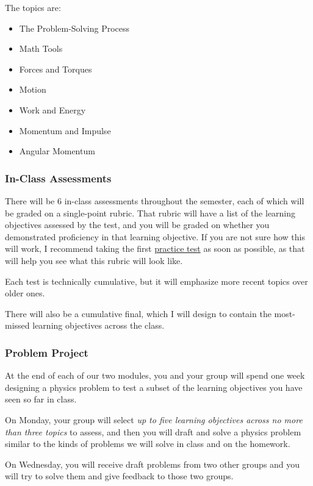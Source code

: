\documentclass[
  letterpaper,
  DIV=11,
  numbers=noendperiod]{scrartcl}
\providecommand{\tightlist}{%
  \setlength{\itemsep}{0pt}\setlength{\parskip}{0pt}}
\begin{document}
The topics are:

\begin{itemize}
\tightlist
\item
  The Problem-Solving Process
\item
  Math Tools
\item
  Forces and Torques
\item
  Motion
\item
  Work and Energy
\item
  Momentum and Impulse
\item
  Angular Momentum
\end{itemize}

\subsubsection{In-Class Assessments}

There will be 6 in-class assessments throughout the semester, each of
which will be graded on a single-point rubric. That rubric will have a
list of the learning objectives assessed by the test, and you will be
graded on whether you demonstrated proficiency in that learning
objective. If you are not sure how this will work, I recommend taking
the first \hyperref[practicetests]{practice test} as soon as possible,
as that will help you see what this rubric will look like.

Each test is technically cumulative, but it will emphasize more recent
topics over older ones.

There will also be a cumulative final, which I will design to contain
the most-missed learning objectives across the class.

\subsubsection{Problem Project}

At the end of each of our two modules, you and your group will spend one
week designing a physics problem to test a subset of the learning
objectives you have seen so far in class.

On Monday, your group will select \emph{up to five learning objectives
across no more than three topics} to assess, and then you will draft and
solve a physics problem similar to the kinds of problems we will solve
in class and on the homework.

On Wednesday, you will receive draft problems from two other groups and
you will try to solve them and give feedback to those two groups.
\end{document}
